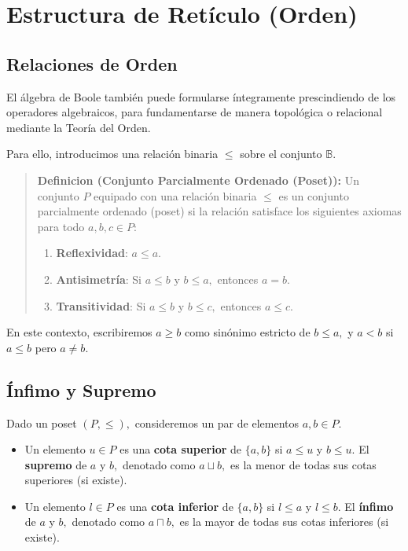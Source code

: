 \chapter{Estructura de Retículo (Orden)}

\section{Relaciones de Orden}
El álgebra de Boole también puede formularse íntegramente prescindiendo de los operadores algebraicos, para fundamentarse de manera topológica o relacional mediante la Teoría del Orden. 

Para ello, introducimos una relación binaria $\le$ sobre el conjunto $\mathbb{B}.$ 

\begin{quote}\textbf{Definicion (Conjunto Parcialmente Ordenado (Poset)):}\label{poset}
Un conjunto $P$ equipado con una relación binaria $\le$ es un conjunto parcialmente ordenado (poset) si la relación satisface los siguientes axiomas para todo $a, b, c \in P:$
\begin{enumerate}
    \item \textbf{Reflexividad}: $a \le a.$
    \item \textbf{Antisimetría}: Si $a \le b$ y $b \le a,$ entonces $a = b.$
    \item \textbf{Transitividad}: Si $a \le b$ y $b \le c,$ entonces $a \le c.$
\end{enumerate}
\end{quote}

En este contexto, escribiremos $a \ge b$ como sinónimo estricto de $b \le a,$ y $a < b$ si $a \le b$ pero $a \ne b.$

\section{Ínfimo y Supremo}

Dado un poset $(P, \le),$ consideremos un par de elementos $a, b \in P.$ 
\begin{itemize}
    \item Un elemento $u \in P$ es una \textbf{cota superior} de $\{a, b\}$ si $a \le u$ y $b \le u.$ El \textbf{supremo} de $a$ y $b,$ denotado como $a \sqcup b,$ es la menor de todas sus cotas superiores (si existe).
    \item Un elemento $l \in P$ es una \textbf{cota inferior} de $\{a, b\}$ si $l \le a$ y $l \le b.$ El \textbf{ínfimo} de $a$ y $b,$ denotado como $a \sqcap b,$ es la mayor de todas sus cotas inferiores (si existe).
\end{itemize}


